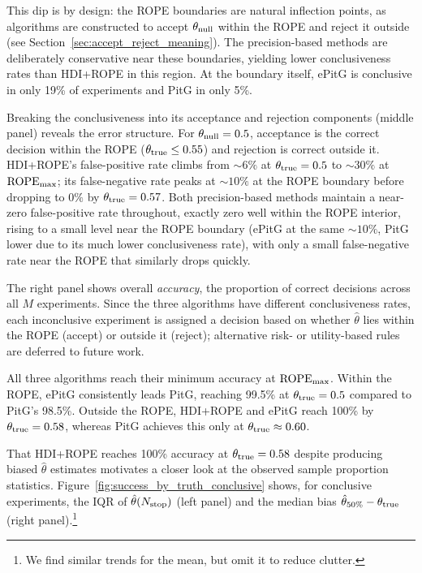 This dip is by design: the ROPE boundaries are natural inflection points, as algorithms
are constructed to accept $\theta_{\rm null}$ within the ROPE and reject it outside
(see Section~\ref{sec:accept_reject_meaning}).
The precision-based methods are deliberately conservative near these boundaries, yielding
lower conclusiveness rates than HDI+ROPE in this region. At the boundary itself, ePitG
is conclusive in only 19\% of experiments and PitG in only 5\%.

Breaking the conclusiveness into its acceptance and rejection components (middle panel)
reveals the error structure.
For $\theta_{\rm null}=0.5$, acceptance is the correct decision within the ROPE
($\theta_{\rm true}\le 0.55$) and rejection is correct outside it.
HDI+ROPE's false-positive rate climbs from $\sim\!6\%$ at $\theta_{\rm true}=0.5$
to $\sim\!30\%$ at ${\rm ROPE}_{\rm max}$; its false-negative rate peaks at
$\sim\!10\%$ at the ROPE boundary before dropping to $0\%$ by
$\theta_{\rm true}=0.57$. Both precision-based methods maintain a near-zero
false-positive rate throughout, exactly zero well within the ROPE interior, rising to a
small level near the ROPE boundary (ePitG at the same $\sim\!10\%$, PitG lower due to
its much lower conclusiveness rate), with only a small false-negative rate near the ROPE
that similarly drops quickly.

The right panel shows overall \textit{accuracy}, the proportion of correct decisions
across all $M$ experiments. Since the three algorithms have different conclusiveness
rates, each inconclusive experiment is assigned a decision based on whether
$\hat{\theta}$ lies within the ROPE (accept) or outside it (reject); alternative
risk- or utility-based rules are deferred to future work.

All three algorithms reach their minimum accuracy at ${\rm ROPE}_{\rm max}$. Within
the ROPE, ePitG consistently leads PitG, reaching 99.5\% at $\theta_{\rm true}=0.5$
compared to PitG's 98.5\%. Outside the ROPE, HDI+ROPE and ePitG reach 100\% by
$\theta_{\rm true}=0.58$, whereas PitG achieves this only at
$\theta_{\rm true}\approx 0.60$.

That HDI+ROPE reaches 100\% accuracy at $\theta_{\rm true}=0.58$ despite
producing biased $\hat{\theta}$ estimates motivates a closer look at the observed
sample proportion statistics. Figure~\ref{fig:success_by_truth_conclusive} shows, for
conclusive experiments, the IQR of $\hat{\theta}(N_{\rm stop})$ (left panel) and the
median bias $\hat{\theta}_{\rm 50\%}-\theta_{\rm true}$ (right panel).\footnote{We find
similar trends for the mean, but omit it to reduce clutter.}

